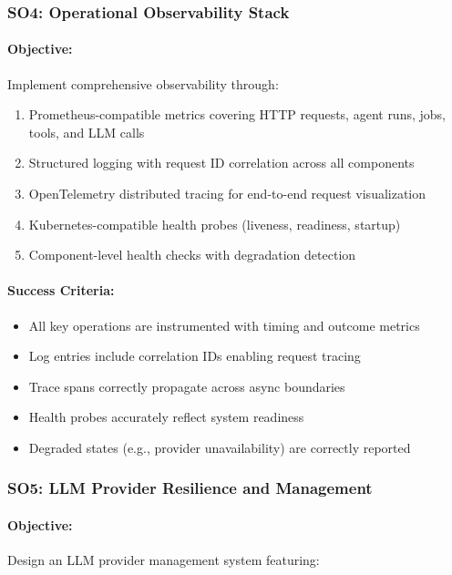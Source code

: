 \documentclass[a4paper,twoside]{sapthesis}
\begin{document}
\subsubsection{SO4: Operational Observability Stack}

\paragraph{Objective:} Implement comprehensive observability through:

\begin{enumerate}
    \item Prometheus-compatible metrics covering HTTP requests, agent runs, jobs, tools, and LLM calls
    \item Structured logging with request ID correlation across all components
    \item OpenTelemetry distributed tracing for end-to-end request visualization
    \item Kubernetes-compatible health probes (liveness, readiness, startup)
    \item Component-level health checks with degradation detection
\end{enumerate}

\paragraph{Success Criteria:}
\begin{itemize}
    \item All key operations are instrumented with timing and outcome metrics
    \item Log entries include correlation IDs enabling request tracing
    \item Trace spans correctly propagate across async boundaries
    \item Health probes accurately reflect system readiness
    \item Degraded states (e.g., provider unavailability) are correctly reported
\end{itemize}

\subsubsection{SO5: LLM Provider Resilience and Management}

\paragraph{Objective:} Design an LLM provider management system featuring:
\end{document}
